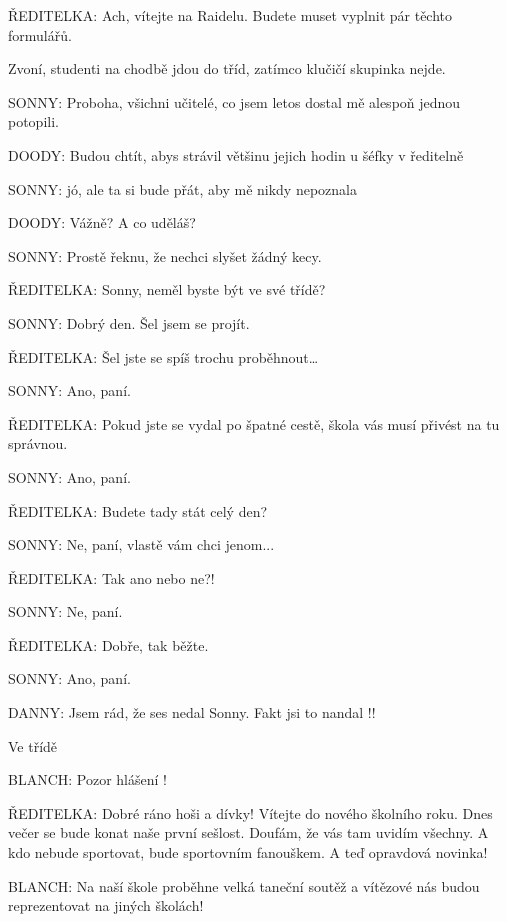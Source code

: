 \rep ŘEDITELKA:        Ach, vítejte na Raidelu. Budete muset vyplnit pár těchto formulářů.        

\scene

\pop Zvoní, studenti na chodbě jdou do tříd, zatímco klučičí skupinka nejde.

\rep SONNY:         Proboha, všichni učitelé, co jsem letos dostal mě alespoň jednou potopili.

\rep DOODY:        Budou chtít, abys strávil většinu jejich hodin u šéfky v ředitelně

\rep SONNY:        jó, ale ta si bude přát, aby mě nikdy nepoznala

\rep DOODY:        Vážně? A co uděláš? 

\rep SONNY:        Prostě řeknu, že nechci slyšet žádný kecy. 

\rep ŘEDITELKA:         Sonny, neměl byste být ve své třídě?

\rep SONNY:         Dobrý den. Šel jsem se projít.

\rep ŘEDITELKA:        Šel jste se spíš trochu proběhnout…

\rep SONNY:        Ano, paní.

\rep ŘEDITELKA:        Pokud jste se vydal po špatné cestě, škola vás musí přivést na tu                 správnou.

\rep SONNY:        Ano, paní.

\rep ŘEDITELKA:        Budete tady stát celý den?

\rep SONNY:        Ne, paní, vlastě vám chci jenom...

\rep ŘEDITELKA:        Tak ano nebo ne?!

\rep SONNY:        Ne, paní.

\rep ŘEDITELKA:        Dobře, tak běžte. 

\rep SONNY:        Ano, paní.

\rep DANNY:        Jsem rád, že ses nedal  Sonny. Fakt jsi to nandal !!

\scene Ve třídě 

\rep BLANCH:            Pozor hlášení ! 

\rep ŘEDITELKA:                 Dobré ráno hoši a dívky! Vítejte do nového školního roku.
    Dnes večer se bude konat naše první sešlost. Doufám, že vás tam  uvidím všechny. A kdo nebude sportovat, bude sportovním fanouškem. A  teď opravdová novinka!  

\rep BLANCH:             Na naší škole proběhne velká taneční soutěž  a vítězové nás budou reprezentovat na jiných školách!

